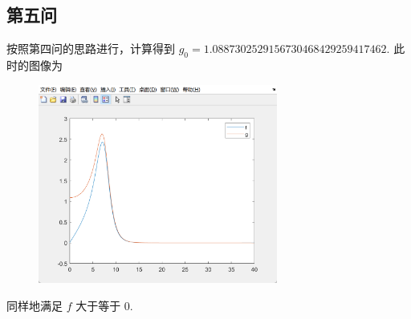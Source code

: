 \documentclass[11pt]{ctexart}
\begin{document}
    \subsection{第五问}
    按照第四问的思路进行，计算得到 \(g_0=1.0887302529156730468429259417462\).
    此时的图像为
    \begin{figure}[H]
        \centering
        \includegraphics[width=0.7\textwidth]{picture/exp3_5}
    \end{figure}

    同样地满足 \(f\) 大于等于 0.
\end{document}

